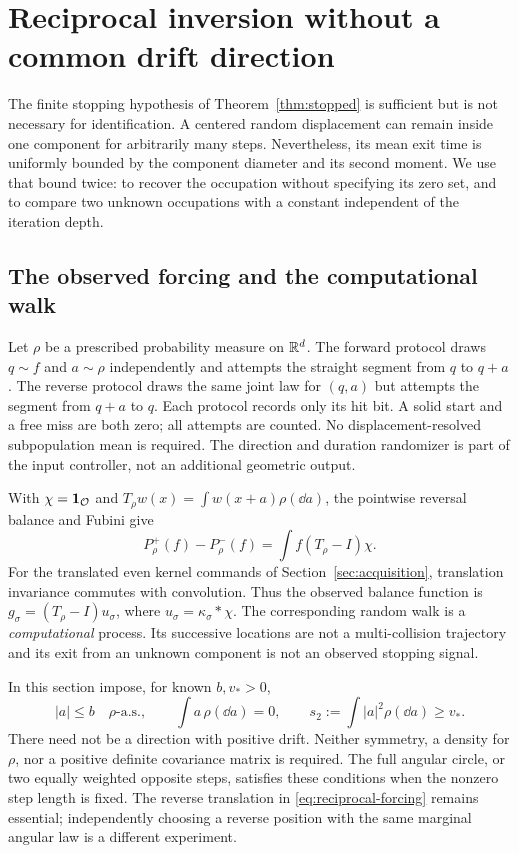 \section{Reciprocal inversion without a common drift direction}
\label{sec:mean-exit}
The finite stopping hypothesis of Theorem~\ref{thm:stopped} is sufficient
but is not necessary for identification. A centered random displacement
can remain inside one component for arbitrarily many steps. Nevertheless,
its mean exit time is uniformly bounded by the component diameter and
its second moment. We use that bound twice: to recover the occupation
without specifying its zero set, and to compare two unknown occupations
with a constant independent of the iteration depth.

\subsection{The observed forcing and the computational walk}
Let $\rho$ be a prescribed probability measure on $\mathbb R^d$. The forward
protocol draws $q\sim f$ and $a\sim\rho$ independently and attempts the
straight segment from $q$ to $q+a$. The reverse protocol draws the same
joint law for $(q,a)$ but attempts the segment from $q+a$ to $q$.
Each protocol records only its hit bit. A solid start and a free miss
are both zero; all attempts are counted. No displacement-resolved
subpopulation mean is required. The direction and duration randomizer
is part of the input controller, not an additional geometric output.

With $\chi=\mathbf 1_{\mathcal O}$ and
$T_\rho w(x)=\int w(x+a)\rho(\dd a)$, the pointwise reversal balance
and Fubini give
\begin{equation}\label{eq:reciprocal-forcing}
 P_\rho^+(f)-P_\rho^-(f)=\int f(T_\rho-I)\chi.
\end{equation}
For the translated even kernel commands of Section~\ref{sec:acquisition},
translation invariance commutes with convolution. Thus the observed
balance function is $g_\sigma=(T_\rho-I)u_\sigma$, where
$u_\sigma=\kappa_\sigma*\chi$. The corresponding random walk is a
\emph{computational} process. Its successive locations are not a
multi-collision trajectory and its exit from an unknown component is
not an observed stopping signal.

In this section impose, for known $b,v_*>0$,
\begin{equation}\label{eq:centered-law}
 |a|\le b\quad\rho\text{-a.s.},\qquad
 \int a\,\rho(\dd a)=0,\qquad
 s_2:=\int|a|^2\rho(\dd a)\ge v_*.
\end{equation}
There need not be a direction with positive drift. Neither symmetry,
a density for $\rho$, nor a positive definite covariance matrix is
required. The full angular circle, or two equally weighted opposite
steps, satisfies these conditions when the nonzero step length is fixed.
The reverse translation in \eqref{eq:reciprocal-forcing} remains essential;
independently choosing a reverse position with the same marginal
angular law is a different experiment.

